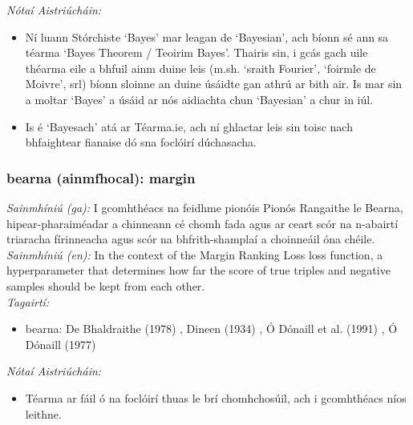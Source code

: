 \documentclass{article}
\begin{document}
 \noindent \textit{Nótaí Aistriúcháin:}
\begin{itemize}
	\item Ní luann Stórchiste `Bayes' mar leagan de `Bayesian', ach bíonn sé ann sa téarma `Bayes Theorem / Teoirim Bayes'. Thairis sin, i gcás gach uile théarma eile a bhfuil ainm duine leis (m.sh. `sraith Fourier', `foirmle de Moivre', srl) bíonn sloinne an duine úsáidte gan athrú ar bith air. Is mar sin a moltar `Bayes' a úsáid ar nós aidiachta chun `Bayesian' a chur in iúl.
	\item Is é `Bayesach' atá ar Téarma.ie, ach ní ghlactar leis sin toisc nach bhfaightear fianaise dó sna foclóirí dúchasacha.
\end{itemize}


\subsubsection*{bearna (ainmfhocal): margin}
 \noindent \textit{Sainmhíniú (ga):} I gcomhthéacs na feidhme pionóis Pionós Rangaithe le Bearna, hipear-pharaiméadar a chinneann cé chomh fada agus ar ceart scór na n-abairtí triaracha fírinneacha agus scór na bhfrith-shamplaí a choinneáil óna chéile.
\\
 \noindent \textit{Sainmhíniú (en):} In the context of the Margin Ranking Loss loss function, a hyperparameter that determines how far the score of true triples and negative samples should be kept from each other.
\\
 \noindent \textit{Tagairtí:}
\begin{itemize}
	\item bearna: De Bhaldraithe (1978) \cite{de-bhaldraithe}, Dineen (1934) \cite{dineen}, Ó Dónaill et al. (1991) \cite{focloir-beag}, Ó Dónaill (1977) \cite{odonaill}
\end{itemize}

 \noindent \textit{Nótaí Aistriúcháin:}
\begin{itemize}
	\item Téarma ar fáil ó na foclóirí thuas le brí chomhchosúil, ach i gcomhthéacs níos leithne.
\end{itemize}
\end{document}
